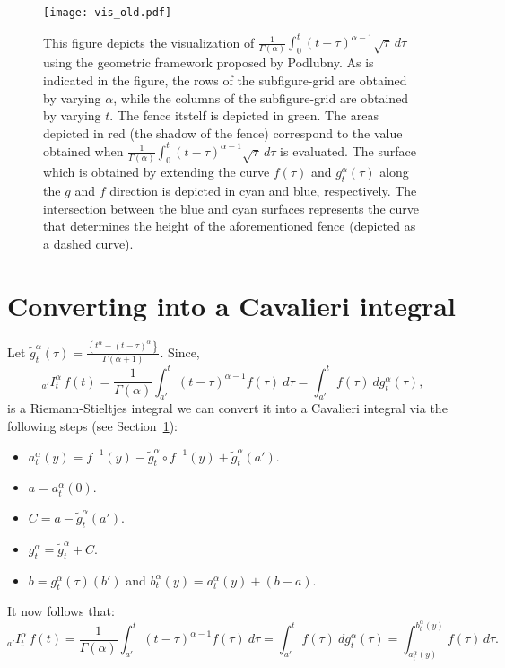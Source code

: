 \documentclass[twoside,reqno,11pt]{fcaa-var} %
\begin{document}


\begin{figure}[htb]
\centering
\texttt{[image: vis\_old.pdf]}
\caption{This figure depicts the visualization of $\frac{1}{\Gamma(\alpha)}\int_{0}^{t}(t-\tau)^{\alpha-1}\sqrt{\tau}~d\tau$ using the geometric framework proposed by Podlubny.
As is indicated in the figure, the rows of the subfigure-grid are obtained by varying $\alpha$, while the columns of the subfigure-grid are obtained by varying $t$. The fence itstelf is depicted in green. The areas depicted in red (the shadow of the fence) correspond to the value obtained when $\frac{1}{\Gamma(\alpha)}\int_{0}^{t}(t-\tau)^{\alpha-1}\sqrt{\tau}~d\tau$ is evaluated.  The surface which is obtained by extending the curve $f(\tau)$ and $g_t^{\alpha}(\tau)$ along the $g$ and $f$ direction is depicted in cyan and blue, respectively. The intersection between the blue and cyan 
surfaces represents the curve that determines the height of the aforementioned fence (depicted as a dashed curve).   
}
\label{fig:gandh}
\end{figure}


\section{Converting into a Cavalieri integral}
Let $\widetilde{g}_t^{\alpha}(\tau) = \frac{\left \{t^{\alpha} - (t-\tau)^{\alpha} \right \}}{\Gamma(\alpha+1)}$. Since, 
\begin{equation}
_{a'}I_t^{\alpha}\,f(t) = \frac{1}{\Gamma(\alpha)}\int_{a'}^{t}(t-\tau)^{\alpha-1}f(\tau)~d\tau = \int_{a'}^{t} f(\tau)~dg_t^{\alpha}(\tau), 
\end{equation}
is a Riemann-Stieltjes integral we can convert it into a Cavalieri integral via the 
following steps (see Section~\ref{}):
\begin{itemize}
 \item $a_t^{\alpha}(y) = f^{-1}(y) - \widetilde{g}_t^{\alpha}\circ f^{-1}(y)+ \widetilde{g}_t^{\alpha}(a')$.
 \item $a = a_t^{\alpha}(0)$.
 \item $C = a - \widetilde{g}_t^{\alpha}(a')$.
 \item $g_t^{\alpha} = \widetilde{g}_t^{\alpha} + C$.
 \item $b = g_t^{\alpha}(\tau)(b')$ and $b_t^{\alpha}(y) = a_t^{\alpha}(y) + (b-a)$.
\end{itemize}
It now follows that:
\begin{equation}
_{a'}I_t^{\alpha}\,f(t) =  \frac{1}{\Gamma(\alpha)}\int_{a'}^{t}(t-\tau)^{\alpha-1}f(\tau)~d\tau= \int_{a'}^{t} f(\tau)~dg_t^{\alpha}(\tau) = \int_{a_t^{\alpha}(y)}^{b_t^{\alpha}(y)} f(\tau)\,d\tau.
\end{equation}
\end{document}
